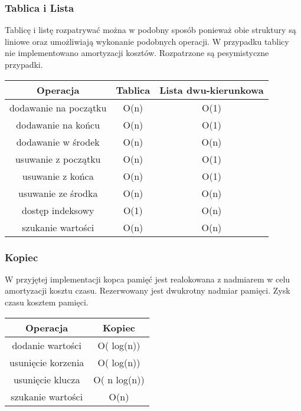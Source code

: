 \documentclass[polish, 11pt]{article}
\begin{document}
    \subsubsection{Tablica i Lista}
    	Tablicę i listę rozpatrywać można w podobny sposób ponieważ obie struktury są liniowe oraz umożliwiają wykonanie podobnych operacji. W przypadku tablicy nie implementowano amortyzacji kosztów. Rozpatrzone są pesymistyczne przypadki.
    	\par
    	
    \hspace{400pt}
    \begin{center}
    
    \begin{tabular}{c|c|c}
    Operacja  & Tablica  & Lista dwu-kierunkowa  \\
    \hline
    dodawanie na początku & O(n) & O(1)  \\
    dodawanie na końcu		 & O(n)  & O(1)  \\
    dodawanie w środek 	 	 & O(n)  & O(n) \\
    \hline
    usuwanie z początku		 & O(n)	& O(1)\\
    usuwanie z końca 			 & O(n)  &  O(1)\\
    usuwanie ze środka 		 & O(n)  &  O(n) \\
    \hline
    dostęp indeksowy			 & O(1)	& O(n)	   \\ 				
    szukanie wartości 			 & O(n)  &  O(n)  \\
	\end{tabular}
 \end{center}
   \subsubsection{Kopiec}
    	W przyjętej implementacji kopca pamięć jest realokowana z nadmiarem w celu amortyzacji kosztu czasu. Rezerwowany jest dwukrotny nadmiar pamięci. Zysk czasu kosztem pamięci.
    	\par
    	    \hspace{400pt}
    	    \begin{center}
    	    
    	    \begin{tabular}{c|c}
   		 Operacja  & Kopiec  \\    
   		 \hline
  		  dodanie wartości			 & O( log(n))   \\ 
  		  usunięcie korzenia			 & O( log(n))   \\ 				
  		  usunięcie klucza		 & O( n log(n))   \\ 				
   		 szukanie wartości 			 & O(n) \\
    
			\end{tabular}
	   \end{center}
		
\end{document}
